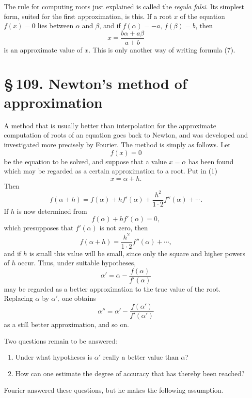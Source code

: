 \documentclass[11pt]{article}
\providecommand{\sect}[2]{\section*{\S\,#1. #2}}
\begin{document}
The rule for computing roots just explained is called the \emph{regula falsi}. Its simplest form, suited for the first approximation, is this. If a root $x$ of the equation $f(x)=0$ lies between $\alpha$ and $\beta$, and if $f(\alpha)=-a$, $f(\beta)=b$, then
\begin{equation}
        x=\frac{b\alpha+a\beta}{a+b}
\tag{9}
\end{equation}
is an approximate value of $x$. This is only another way of writing formula (7).

\sect{109}{Newton's method of approximation}

A method that is usually better than interpolation for the approximate computation of roots of an equation goes back to Newton, and was developed and investigated more precisely by Fourier. The method is simply as follows. Let
\begin{equation}
        f(x)=0
\tag{1}
\end{equation}
be the equation to be solved, and suppose that a value $x=\alpha$ has been found which may be regarded as a certain approximation to a root. Put in (1)
\[
        x=\alpha+h.
\]
Then
\begin{equation}
        f(\alpha+h)=f(\alpha)+hf'(\alpha)+\frac{h^2}{1\cdot2}f''(\alpha)+\cdots .
\tag{2}
\end{equation}
If $h$ is now determined from
\begin{equation}
        f(\alpha)+hf'(\alpha)=0,
\tag{3}
\end{equation}
which presupposes that $f'(\alpha)$ is not zero, then
\[
        f(\alpha+h)=\frac{h^2}{1\cdot2}f''(\alpha)+\cdots ,
\]
and if $h$ is small this value will be small, since only the square and higher powers of $h$ occur. Thus, under suitable hypotheses,
\begin{equation}
        \alpha'=\alpha-\frac{f(\alpha)}{f'(\alpha)}
\tag{4}
\end{equation}
may be regarded as a better approximation to the true value of the root. Replacing $\alpha$ by $\alpha'$, one obtains
\[
        \alpha''=\alpha'-\frac{f(\alpha')}{f'(\alpha')}
\]
as a still better approximation, and so on.

Two questions remain to be answered:
\begin{enumerate}[label=\arabic*.]
\item Under what hypotheses is $\alpha'$ really a better value than $\alpha$?
\item How can one estimate the degree of accuracy that has thereby been reached?
\end{enumerate}
Fourier answered these questions, but he makes the following assumption.
\end{document}

